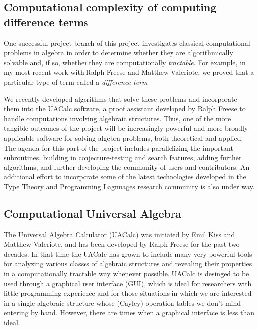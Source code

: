 \documentclass[11pt]{amsart}  %
\begin{document}
\subsection{Computational complexity of computing difference terms}
\label{sec:software-development}
One successful project branch of this project investigates classical computational problems
in algebra in order to determine whether they are algorithmically solvable
and, if so, whether they are computationally \emph{tractable}.
For example, in my most recent work with Ralph Freese and Matthew Valeriote,
we proved that a particular type of term called a \emph{difference term}

We recently developed algorithms that solve these problems and 
incorporate them into the UACalc software, a proof assistant developed
by Ralph Freese to handle computations involving algebraic structures. 
Thus, one of the more tangible outcomes of the project will be
increasingly powerful and more broadly applicable software for solving
algebra problems, both theoretical and applied.
The agenda for this part of the project includes parallelizing the important subroutines,
building in conjecture-testing and search features, adding further algorithms,
and further developing the community of users and contributors. An additional
effort to incorporate some of the latest technologies developed in the Type
Theory and Programming Lagnuages research community is also under way.



\subsection{Computational Universal Algebra}
The Universal Algebra Calculator (UACalc) was initiated by Emil Kiss and Matthew Valeriote,
and has been developed by Ralph Freese for the past two decades.  In that time 
the UACalc has grown to include many very powerful tools for analyzing various 
classes of algebraic structures and revealing their properties in a computationally 
tractable way whenever possible.  UACalc is desinged to be used through a  
graphical user interface (GUI), which is ideal for researchers with little programming experience 
and for those situations in which we are interested in a single algebraic structure 
whose (Cayley) operation tables we don't mind entering by hand. 
However, there are times when a graphical interface is less than ideal.
\end{document}
